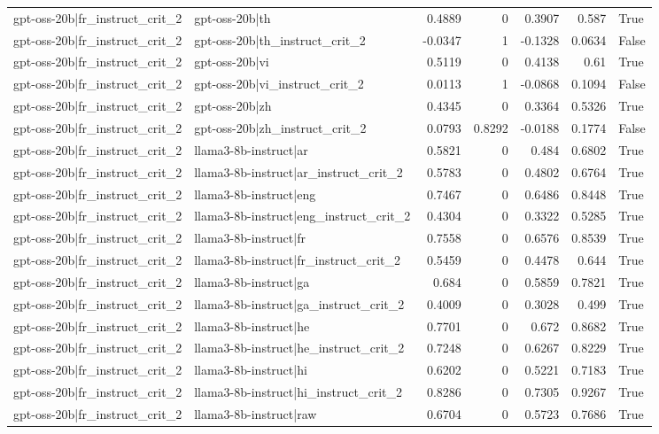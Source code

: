\begin{table}
\begin{tabular}{l l r r r r l}
gpt-oss-20b|fr_instruct_crit_2 & gpt-oss-20b|th & 0.4889 & 0 & 0.3907 & 0.587 & True \\
gpt-oss-20b|fr_instruct_crit_2 & gpt-oss-20b|th_instruct_crit_2 & -0.0347 & 1 & -0.1328 & 0.0634 & False \\
gpt-oss-20b|fr_instruct_crit_2 & gpt-oss-20b|vi & 0.5119 & 0 & 0.4138 & 0.61 & True \\
gpt-oss-20b|fr_instruct_crit_2 & gpt-oss-20b|vi_instruct_crit_2 & 0.0113 & 1 & -0.0868 & 0.1094 & False \\
gpt-oss-20b|fr_instruct_crit_2 & gpt-oss-20b|zh & 0.4345 & 0 & 0.3364 & 0.5326 & True \\
gpt-oss-20b|fr_instruct_crit_2 & gpt-oss-20b|zh_instruct_crit_2 & 0.0793 & 0.8292 & -0.0188 & 0.1774 & False \\
gpt-oss-20b|fr_instruct_crit_2 & llama3-8b-instruct|ar & 0.5821 & 0 & 0.484 & 0.6802 & True \\
gpt-oss-20b|fr_instruct_crit_2 & llama3-8b-instruct|ar_instruct_crit_2 & 0.5783 & 0 & 0.4802 & 0.6764 & True \\
gpt-oss-20b|fr_instruct_crit_2 & llama3-8b-instruct|eng & 0.7467 & 0 & 0.6486 & 0.8448 & True \\
gpt-oss-20b|fr_instruct_crit_2 & llama3-8b-instruct|eng_instruct_crit_2 & 0.4304 & 0 & 0.3322 & 0.5285 & True \\
gpt-oss-20b|fr_instruct_crit_2 & llama3-8b-instruct|fr & 0.7558 & 0 & 0.6576 & 0.8539 & True \\
gpt-oss-20b|fr_instruct_crit_2 & llama3-8b-instruct|fr_instruct_crit_2 & 0.5459 & 0 & 0.4478 & 0.644 & True \\
gpt-oss-20b|fr_instruct_crit_2 & llama3-8b-instruct|ga & 0.684 & 0 & 0.5859 & 0.7821 & True \\
gpt-oss-20b|fr_instruct_crit_2 & llama3-8b-instruct|ga_instruct_crit_2 & 0.4009 & 0 & 0.3028 & 0.499 & True \\
gpt-oss-20b|fr_instruct_crit_2 & llama3-8b-instruct|he & 0.7701 & 0 & 0.672 & 0.8682 & True \\
gpt-oss-20b|fr_instruct_crit_2 & llama3-8b-instruct|he_instruct_crit_2 & 0.7248 & 0 & 0.6267 & 0.8229 & True \\
gpt-oss-20b|fr_instruct_crit_2 & llama3-8b-instruct|hi & 0.6202 & 0 & 0.5221 & 0.7183 & True \\
gpt-oss-20b|fr_instruct_crit_2 & llama3-8b-instruct|hi_instruct_crit_2 & 0.8286 & 0 & 0.7305 & 0.9267 & True \\
gpt-oss-20b|fr_instruct_crit_2 & llama3-8b-instruct|raw & 0.6704 & 0 & 0.5723 & 0.7686 & True \\

\end{tabular}
\end{table}
